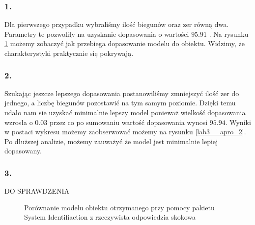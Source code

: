 \subsubsection{1. }
Dla pierwszego przypadku wybraliśmy ilość biegunów oraz zer równą dwa. Parametry te pozwoliły na uzyskanie dopasowania o wartości $ \num{95.91} $ \text{\%}. Na rysunku \ref{lab3_apro_1} możemy zobaczyć jak przebiega dopasowanie modelu do obiektu. Widzimy, że charakterystyki praktycznie się pokrywają. 

\subsubsection{2. }
Szukając jeszcze lepszego dopasowania postanowiliśmy zmniejszyć ilość zer do jednego, a liczbę biegunów pozostawić na tym samym poziomie. Dzięki temu udało nam sie uzyskać minimalnie lepszy model ponieważ wielkość dopasowania wzrosła o $\num{0.03}$ przez co po sumowaniu wartość dopasowania wynosi $\num{95.94}$. Wyniki w postaci wykresu możemy zaobserwować możemy na rysunku \ref{lab3__apro_2}. Po dłuższej analizie, możemy zauważyć że model jest minimalnie lepiej dopasowany. 
\subsubsection{3. }
DO SPRAWDZENIA 
\begin{figure}[t]
    \centering
    \caption{Porównanie modelu obiektu otrzymanego przy pomocy pakietu System Identifiaction
z rzeczywista odpowiedzia skokowa}
    \label{lab3_apro_1}
\end{figure}

